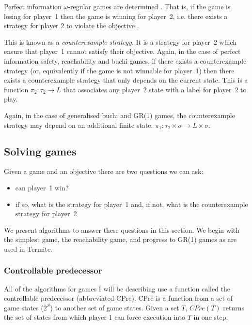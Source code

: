 Perfect information $\omega$-regular games are determined . That is, if the game is losing for player~1 then the game is winning for player~2, i.e. there exists a strategy for player 2 to violate the objective \cite{something}.

This is known as a \emph{counterexample strategy}. It is a strategy for player~2 which ensure that player~1 cannot satisfy their objective. Again, in the case of perfect information safety, reachability and buchi games, if there exists a counterexample strategy (or, equivalently if the game is not winnable for player~1) then there exists a counterexample strategy that only depends on the current state. This is a function $\pi_2 : \tau_2 \rightarrow L$ that associates any player~2 state with a label for player~2 to play. 

Again, in the case of generalised buchi and GR(1) games, the counterexample strategy may depend on an additional finite state: $\pi_1 : \tau_2 \times \sigma \rightarrow L \times \sigma$.

\subsection{Solving games}

Given a game and an objective there are two questions we can ask:
\begin{itemize}
    \item can player~1 win?
    \item if so, what is the strategy for player~1 and, if not, what is the counterexample strategy for player~2
\end{itemize}

We present algorithms to answer these questions in this section. We begin with the simplest game, the reachability game, and progress to GR(1) games as are used in Termite.

\subsubsection{Controllable predecessor}

All of the algorithms for games I will be describing use a function called the controllable predecessor (abbreviated CPre). CPre is a function from a set of game states ($2^S$) to another set of game states. Given a set $T$, $CPre(T)$ returns the set of states from which player 1 can force execution into $T$ in one step. 

